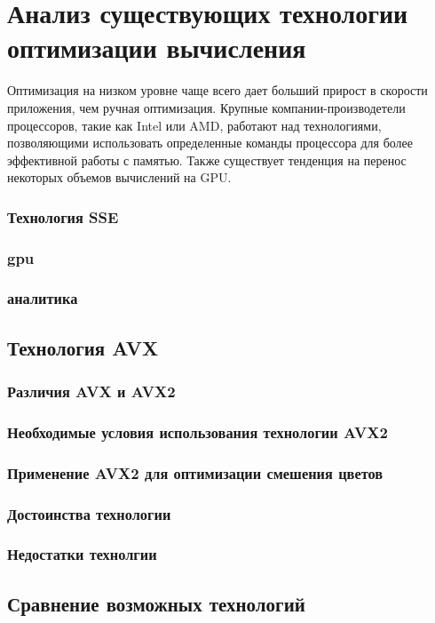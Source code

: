 \section{Анализ существующих технологии оптимизации вычисления}
Оптимизация на низком уровне чаще всего дает больший прирост в скорости приложения, чем ручная оптимизация. Крупные компании-производетели процессоров, такие как Intel или AMD, работают над технологиями, позволяющими использовать определенные команды процессора для более эффективной работы с памятью. Также существует тенденция на перенос некоторых объемов вычислений на GPU. 

\subsubsection{Технология SSE}
\subsubsection{gpu}
\subsubsection{аналитика}
\subsection{Технология AVX}
\subsubsection{Различия AVX и AVX2}
\subsubsection{Необходимые условия использования технологии AVX2}
\subsubsection{Применение AVX2 для оптимизации смешения цветов}
\subsubsection{Достоинства технологии}
\subsubsection{Недостатки технолгии}
\subsection{Сравнение возможных технологий}
\subsection{}


